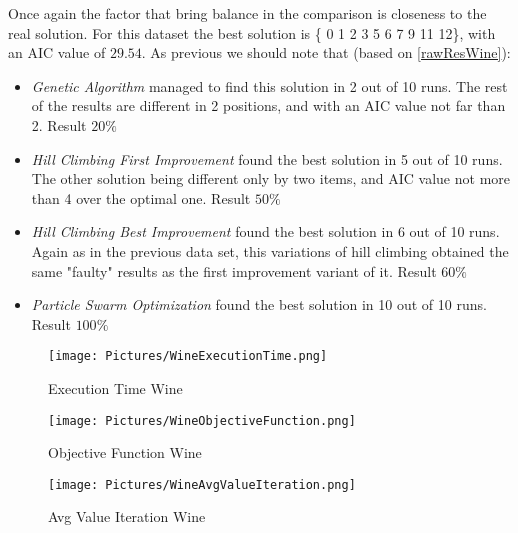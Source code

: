 Once again the factor that bring balance in the comparison is closeness to the real solution. For this dataset the best solution is \{ 0 1 2 3 5 6 7 9 11 12\}, with an AIC value of $29.54$. As previous we should note that (based on \ref{rawResWine}):
\begin{itemize}
	\item \textit{Genetic Algorithm} managed to find this solution in 2 out of 10 runs. The rest of the results are different in 2 positions, and with an AIC value not far than 2. Result $20 \%$
	\item \textit{Hill Climbing First Improvement} found the best solution in 5 out of 10 runs. The other solution being different only by two items, and AIC value not more than 4 over the optimal one. Result $50 \%$
	\item \textit{Hill Climbing Best Improvement} found the best solution in 6 out of 10 runs. Again as in the previous data set, this variations of hill climbing obtained the same "faulty" results as the first improvement variant of it. Result $60 \%$
	\item \textit{Particle Swarm Optimization} found the best solution in 10 out of 10 runs. Result $100 \%$
\end{itemize}


\begin{figure}[ht]
	\texttt{[image: Pictures/WineExecutionTime.png]}
	\caption{ Execution Time Wine}
	\label{Execution Time Wine}
\end{figure}

\begin{figure}[ht]
	\texttt{[image: Pictures/WineObjectiveFunction.png]}
	\caption{ Objective Function Wine }
	\label{Objective Function Wine}
\end{figure}

\begin{figure}[ht]
	\texttt{[image: Pictures/WineAvgValueIteration.png]}
	\caption{ Avg Value Iteration Wine }
	\label{Avg Value Iteration Wine}
\end{figure}


